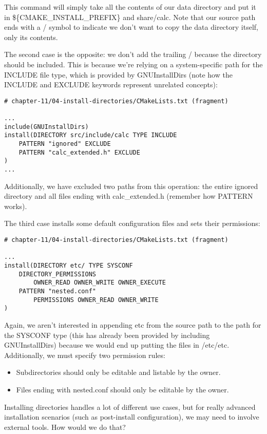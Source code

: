 This command will simply take all the contents of our data directory and put it in \$\{CMAKE\_INSTALL\_PREFIX\} and share/calc. Note that our source path ends with a / symbol to indicate we don't want to copy the data directory itself, only its contents.

The second case is the opposite: we don't add the trailing / because the directory should be included. This is because we're relying on a system-specific path for the INCLUDE file type, which is provided by GNUInstallDirs (note how the INCLUDE and EXCLUDE keywords represent unrelated concepts):

\begin{lstlisting}[style=styleCMake]
# chapter-11/04-install-directories/CMakeLists.txt (fragment)

...
include(GNUInstallDirs)
install(DIRECTORY src/include/calc TYPE INCLUDE
	PATTERN "ignored" EXCLUDE
	PATTERN "calc_extended.h" EXCLUDE
)
...
\end{lstlisting}

Additionally, we have excluded two paths from this operation: the entire ignored directory and all files ending with calc\_extended.h (remember how PATTERN works).

The third case installs some default configuration files and sets their permissions:

\begin{lstlisting}[style=styleCMake]
# chapter-11/04-install-directories/CMakeLists.txt (fragment)

...
install(DIRECTORY etc/ TYPE SYSCONF
	DIRECTORY_PERMISSIONS
		OWNER_READ OWNER_WRITE OWNER_EXECUTE
	PATTERN "nested.conf"
		PERMISSIONS OWNER_READ OWNER_WRITE
)
\end{lstlisting}

Again, we aren't interested in appending etc from the source path to the path for the SYSCONF type (this has already been provided by including GNUInstallDirs) because we would end up putting the files in /etc/etc. Additionally, we must specify two permission rules:

\begin{itemize}
\item 
Subdirectories should only be editable and listable by the owner.

\item 
Files ending with nested.conf should only be editable by the owner.
\end{itemize}

Installing directories handles a lot of different use cases, but for really advanced installation scenarios (such as post-install configuration), we may need to involve external tools. How would we do that?

